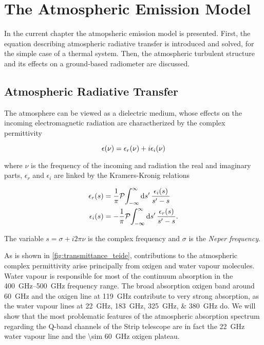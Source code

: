 \chapter{The Atmospheric Emission Model}\label{ch:atm_model}

In the current chapter the atmopsheric emission model is presented. First,
the equation describing atmospheric radiative transfer is introduced and
solved, for the simple case of a thermal system. Then, the atmospheric
turbulent structure and its effects on a ground-based radiometer are
discussed.

\section{Atmospheric Radiative Transfer}

The atmosphere can be viewed as a dielectric medium, whose effects on the
incoming electromagnetic radiation are charactherized by the complex permittivity

\begin{equation}
        \epsilon\qty(\nu) = \epsilon_r\qty(\nu) + i\epsilon_i\qty(\nu)
\end{equation}

where $\nu$ is the frequency of the incoming and radiation the real and
imaginary parts, $\epsilon_r$ and $\epsilon_i$ are linked by the
Kramers-Kronig relations

\begin{align}
        \epsilon_r\qty(s) & = \frac{1}{\pi}
        \principalvalue{\int^\infty_{-\infty}\dd{s'}
        \frac{\epsilon_i\qty(s)}{s' - s}} \label{eq:kk_relations_1} \\
        \epsilon_i\qty(s) & = -\frac{1}{\pi}
        \principalvalue{\int^\infty_{-\infty}\dd{s'}
        \frac{\epsilon_r\qty(s)}{s' - s}} \label{eq:kk_relations_2}.
\end{align}

The variable $s = \sigma + i 2\pi\nu$ is the complex frequency and $\sigma$
is the \emph{Neper frequency}.

As is shown in \autoref{fig:transmittance_teide}, contributions to the
atmospheric complex permittivity arise principally from
oxigen and water vapour molecules. Water vapour is responsible for most of
the continuum absorption in the \SIrange{400}{500}{\giga\hertz} frequency
range. The broad absorption oxigen band around \SI{60}{\giga\hertz} and the
oxigen line at \SI{119}{\giga\hertz} contribute to very strong absorption,
as the water vapour lines at \SIlist{22;183;325;380}{\giga\hertz} do. We will
show that the most problematic features of the atmospheric absorption spectrum
regarding the Q-band channels of the Strip telescope are in fact the
\SI{22}{\giga\hertz} water vapour line and the \SI{\sim 60}{\giga\hertz}
oxigen plateau.

